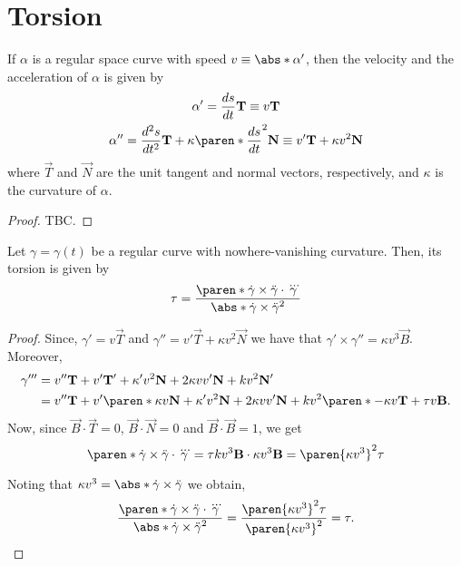 \documentclass[11pt]{penrose}
\newcommand{\vT}{\vec{T}}
\newcommand{\vN}{\vec{N}}
\newcommand{\vB}{\vec{B}}
\begin{document}
\section{Torsion}

\begin{nlemma}
    If $\alpha$ is a regular space curve with speed $v \equiv \abs*{\alpha'}$, then the velocity and the acceleration of $\alpha$ is given by
    \begin{gather}
        \alpha' = \frac{ds}{dt} \vT \equiv v \vT\\
        \alpha'' = \frac{d^2 s}{dt^2} \vT + \kappa \paren*{\frac{ds}{dt}}^2 \vN \equiv v' \vT + \kappa v^2 \vN
    \end{gather}
    where $\vT$ and $\vN$ are the unit tangent and normal vectors, respectively, and $\kappa$ is the curvature of $\alpha$.
\end{nlemma}
\begin{proof}
    TBC.
\end{proof}

\begin{nthm}
    Let $\gamma = \gamma(t)$ be a regular curve with nowhere-vanishing curvature. Then, its torsion is given by
    \begin{equation}
        \tau
        = \frac{\paren*{\dot{\gamma} \times \ddot{\gamma}} \cdot \dddot{\gamma}}{\abs*{\dot{\gamma} \times \ddot{\gamma}}^2}
        \label{eq:torsion-formula}
    \end{equation}
\end{nthm}
\begin{proof}
    Since, $\gamma' = v \vT$ and $\gamma'' = v' \vT + \kappa v^2 \vN$ we have that $\gamma' \times \gamma'' = \kappa v^3 \vB$. Moreover,
    \begin{align}
        \gamma'''
        &= v'' \vT + v' \vT' + \kappa' v^2 \vN + 2 \kappa v v' \vN + k v^2 \vN'\\
        &= v'' \vT + v' \paren*{\kappa v \vN} + \kappa' v^2 \vN + 2 \kappa v v' \vN + k v^2 \paren*{-\kappa v \vT + \tau v \vB}.
    \end{align}
    Now, since $\vB \cdot \vT = 0$, $\vB \cdot \vN = 0$ and $\vB \cdot \vB = 1$, we get
    \begin{equation}
        \paren*{\dot{\gamma} \times \ddot{\gamma}} \cdot \dddot{\gamma}
        = \tau k v^3 \vB \cdot \kappa v^3 \vB
        = \paren{\kappa v^3}^2 \tau
    \end{equation}

    Noting that $\kappa v^3 = \abs*{\dot{\gamma} \times \ddot{\gamma}}$ we obtain,
    \begin{equation}
        \frac{\paren*{\dot{\gamma} \times \ddot{\gamma}} \cdot \dddot{\gamma}}{\abs*{\dot{\gamma} \times \ddot{\gamma}}^2}
        = \frac{\paren{\kappa v^3}^2 \tau}{\paren{\kappa v^3}^2}
        = \tau.\qedhere
    \end{equation}
\end{proof}
\end{document}
